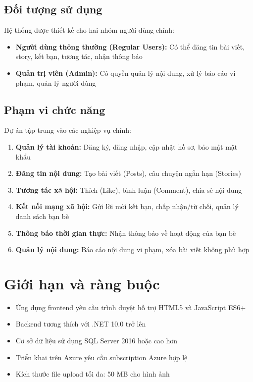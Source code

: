 \subsection{Đối tượng sử dụng}
Hệ thống được thiết kế cho hai nhóm người dùng chính:

\begin{itemize}
    \item \textbf{Người dùng thông thường (Regular Users):} Có thể đăng tin bài viết, story, kết bạn, tương tác, nhận thông báo
    \item \textbf{Quản trị viên (Admin):} Có quyền quản lý nội dung, xử lý báo cáo vi phạm, quản lý người dùng
\end{itemize}

\subsection{Phạm vi chức năng}
Dự án tập trung vào các nghiệp vụ chính:

\begin{enumerate}
    \item \textbf{Quản lý tài khoản:} Đăng ký, đăng nhập, cập nhật hồ sơ, bảo mật mật khẩu
    \item \textbf{Đăng tin nội dung:} Tạo bài viết (Posts), câu chuyện ngắn hạn (Stories)
    \item \textbf{Tương tác xã hội:} Thích (Like), bình luận (Comment), chia sẻ nội dung
    \item \textbf{Kết nối mạng xã hội:} Gửi lời mời kết bạn, chấp nhận/từ chối, quản lý danh sách bạn bè
    \item \textbf{Thông báo thời gian thực:} Nhận thông báo về hoạt động của bạn bè
    \item \textbf{Quản lý nội dung:} Báo cáo nội dung vi phạm, xóa bài viết không phù hợp
\end{enumerate}

\section{Giới hạn và ràng buộc}
\begin{itemize}
    \item Ứng dụng frontend yêu cầu trình duyệt hỗ trợ HTML5 và JavaScript ES6+
    \item Backend tương thích với .NET 10.0 trở lên
    \item Cơ sở dữ liệu sử dụng SQL Server 2016 hoặc cao hơn
    \item Triển khai trên Azure yêu cầu subscription Azure hợp lệ
    \item Kích thước file upload tối đa: 50 MB cho hình ảnh
\end{itemize}
